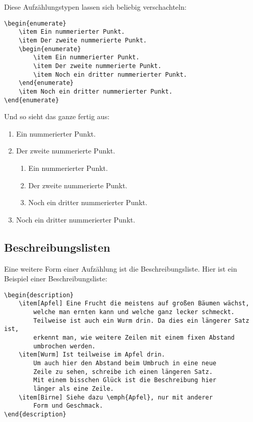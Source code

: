 Diese Aufzählungstypen lassen sich beliebig verschachteln:

\begin{lstlisting}
\begin{enumerate}
	\item Ein nummerierter Punkt.
	\item Der zweite nummerierte Punkt.
	\begin{enumerate}
		\item Ein nummerierter Punkt.
		\item Der zweite nummerierte Punkt.
		\item Noch ein dritter nummerierter Punkt.
	\end{enumerate}
	\item Noch ein dritter nummerierter Punkt.
\end{enumerate}
\end{lstlisting}

Und so sieht das ganze fertig aus:

\begin{enumerate}
	\item Ein nummerierter Punkt.
	\item Der zweite nummerierte Punkt.
	\begin{enumerate}
		\item Ein nummerierter Punkt.
		\item Der zweite nummerierte Punkt.
		\item Noch ein dritter nummerierter Punkt.
	\end{enumerate}
	\item Noch ein dritter nummerierter Punkt.
\end{enumerate}


\subsection{Beschreibungslisten}

Eine weitere Form einer Aufzählung ist die Beschreibungsliste. Hier ist ein Beispiel einer Beschreibungsliste:

\begin{lstlisting}
\begin{description}
	\item[Apfel] Eine Frucht die meistens auf großen Bäumen wächst,
		welche man ernten kann und welche ganz lecker schmeckt.
		Teilweise ist auch ein Wurm drin. Da dies ein längerer Satz ist,
		erkennt man, wie weitere Zeilen mit einem fixen Abstand 
		umbrochen werden.
	\item[Wurm] Ist teilweise im Apfel drin.
		Um auch hier den Abstand beim Umbruch in eine neue 
		Zeile zu sehen, schreibe ich einen längeren Satz.
		Mit einem bisschen Glück ist die Beschreibung hier
		länger als eine Zeile.
	\item[Birne] Siehe dazu \emph{Apfel}, nur mit anderer
		Form und Geschmack.
\end{description}
\end{lstlisting}

